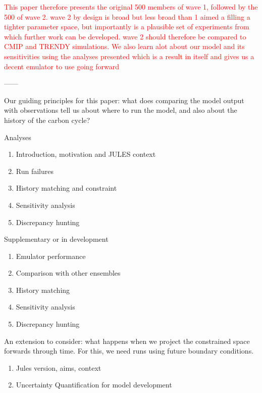 \documentclass[gmd, manuscript]{copernicus}
\begin{document}
\textcolor{red}{This paper therefore presents the original 500 members of wave 1, followed by the 500 of wave 2. wave 2 by design is broad but less broad than 1 aimed a filling a tighter parameter space, but importantly is a plausible set of experiments from which further work can be developed. wave 2 should therefore be compared to CMIP and TRENDY simulations. We also learn alot about our model and its sensitivities using the analyses presented which is a result in itself and gives us a decent emulator to use going forward}



------

Our guiding principles for this paper: what does comparing the model output with observations tell us about where to run the model, and also about the history of the carbon cycle?

Analyses
\begin{enumerate}
    \item Introduction, motivation and JULES context
    \item Run failures
    \item History matching and constraint
    \item Sensitivity analysis
    \item Discrepancy hunting
\end{enumerate}

Supplementary or in development

\begin{enumerate}
    \item Emulator performance
    \item Comparison with other ensembles
    \item History matching
    \item Sensitivity analysis
    \item Discrepancy hunting
\end{enumerate}

An extension to consider: what happens when we project the constrained space forwards through time. For this, we need runs using future boundary conditions.

\introduction  %

\begin{enumerate}
    \item Jules version, aims, context 
    \item Uncertainty Quantification for model development
\end{enumerate}
\end{document}
